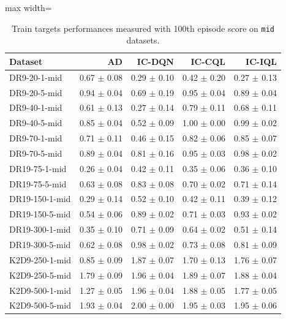 \documentclass{article}
\begin{document}
\begin{table}[ht]
    \label{tab:}
    \begin{center}
     \caption{Train targets performances measured with 100th episode score on \texttt{mid} datasets.}
    \begin{small}
    \begin{adjustbox}{max width=\columnwidth}
		\begin{tabular}{l|rrrr}
		\toprule
	\textbf{Dataset} & \textbf{AD} & \textbf{IC-DQN} & \textbf{IC-CQL} & \textbf{IC-IQL}\\
\midrule
DR9-20-1-mid & 0.67 $\pm$ 0.08 & 0.29 $\pm$ 0.10 & 0.42 $\pm$ 0.20 & 0.27 $\pm$ 0.13\\
DR9-20-5-mid & 0.94 $\pm$ 0.04 & 0.69 $\pm$ 0.19 & 0.95 $\pm$ 0.04 & 0.89 $\pm$ 0.04\\
DR9-40-1-mid & 0.61 $\pm$ 0.13 & 0.27 $\pm$ 0.14 & 0.79 $\pm$ 0.11 & 0.68 $\pm$ 0.11\\
DR9-40-5-mid & 0.85 $\pm$ 0.04 & 0.52 $\pm$ 0.09 & 1.00 $\pm$ 0.00 & 0.99 $\pm$ 0.02\\
DR9-70-1-mid & 0.71 $\pm$ 0.11 & 0.46 $\pm$ 0.15 & 0.82 $\pm$ 0.06 & 0.85 $\pm$ 0.07\\
DR9-70-5-mid & 0.89 $\pm$ 0.04 & 0.81 $\pm$ 0.16 & 0.95 $\pm$ 0.03 & 0.98 $\pm$ 0.02\\
DR19-75-1-mid & 0.26 $\pm$ 0.04 & 0.42 $\pm$ 0.11 & 0.35 $\pm$ 0.06 & 0.36 $\pm$ 0.10\\
DR19-75-5-mid & 0.63 $\pm$ 0.08 & 0.83 $\pm$ 0.08 & 0.70 $\pm$ 0.02 & 0.71 $\pm$ 0.14\\
DR19-150-1-mid & 0.29 $\pm$ 0.14 & 0.52 $\pm$ 0.10 & 0.42 $\pm$ 0.11 & 0.39 $\pm$ 0.12\\
DR19-150-5-mid & 0.54 $\pm$ 0.06 & 0.89 $\pm$ 0.02 & 0.71 $\pm$ 0.03 & 0.93 $\pm$ 0.02\\
DR19-300-1-mid & 0.35 $\pm$ 0.10 & 0.71 $\pm$ 0.09 & 0.64 $\pm$ 0.02 & 0.51 $\pm$ 0.14\\
DR19-300-5-mid & 0.62 $\pm$ 0.08 & 0.98 $\pm$ 0.02 & 0.73 $\pm$ 0.08 & 0.81 $\pm$ 0.09\\
K2D9-250-1-mid & 0.85 $\pm$ 0.09 & 1.87 $\pm$ 0.07 & 1.70 $\pm$ 0.13 & 1.76 $\pm$ 0.07\\
K2D9-250-5-mid & 1.79 $\pm$ 0.09 & 1.96 $\pm$ 0.04 & 1.89 $\pm$ 0.07 & 1.88 $\pm$ 0.04\\
K2D9-500-1-mid & 1.27 $\pm$ 0.05 & 1.96 $\pm$ 0.04 & 1.88 $\pm$ 0.05 & 1.77 $\pm$ 0.05\\
K2D9-500-5-mid & 1.93 $\pm$ 0.04 & 2.00 $\pm$ 0.00 & 1.95 $\pm$ 0.03 & 1.95 $\pm$ 0.06\\

\end{tabular}
\end{adjustbox}
\end{small}
\end{center}
\end{table}
\end{document}
